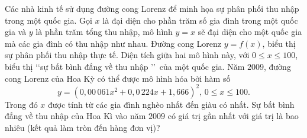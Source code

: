 \begin{ex}%
	Các nhà kinh tế sử dụng đường cong Lorenz để minh họa sự phân phối thu nhập trong một quốc gia. Gọi $x$ là đại diện cho phần trăm số gia đình trong một quốc gia và $y$ là phần trăm tổng thu nhập, mô hình $y=x$ sẽ đại diện cho một quốc gia mà các gia đình có thu nhập như nhau. Đường cong Lorenz $y=f(x)$, biểu thị sự phân phối thu nhập thực tế. Diện tích giữa hai mô hình này, với $0\leq x\leq 100$, biểu thị \lq\lq sự bất bình đẳng về thu nhập \rq\rq \, của một quốc gia. Năm $2009$, đường cong Lorenz của Hoa Kỳ có thể được mô hình hóa bởi hàm số
	$$
	y=\left(0{,}00\,061x^2+0{,}0\,224x+1{,}666\right)^2,\,0\leq x\leq 100.
	$$
	Trong đó $x$ được tính từ các gia đình nghèo nhất đến giàu có nhất. Sự bất bình đẳng về thu nhập của Hoa Kì vào năm $2009$ có giá trị gần nhất với giá trị là bao nhiêu (kết quả làm tròn đến hàng đơn vị)?\\
\end{ex}

